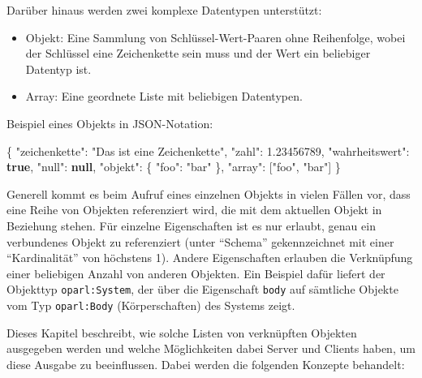 \documentclass[,a4paper]{article}
\newenvironment{Shaded}{}{}
\newcommand{\KeywordTok}[1]{\textcolor[rgb]{0.00,0.44,0.13}{\textbf{{#1}}}}
\newcommand{\DataTypeTok}[1]{\textcolor[rgb]{0.56,0.13,0.00}{{#1}}}
\newcommand{\FloatTok}[1]{\textcolor[rgb]{0.25,0.63,0.44}{{#1}}}
\newcommand{\StringTok}[1]{\textcolor[rgb]{0.25,0.44,0.63}{{#1}}}
\newcommand{\OtherTok}[1]{\textcolor[rgb]{0.00,0.44,0.13}{{#1}}}
\newcommand{\FunctionTok}[1]{\textcolor[rgb]{0.02,0.16,0.49}{{#1}}}
\begin{document}
Darüber hinaus werden zwei komplexe Datentypen unterstützt:

\begin{itemize}
\itemsep1pt\parskip0pt
\item
  Objekt: Eine Sammlung von Schlüssel-Wert-Paaren ohne Reihenfolge,
  wobei der Schlüssel eine Zeichenkette sein muss und der Wert ein
  beliebiger Datentyp ist.
\item
  Array: Eine geordnete Liste mit beliebigen Datentypen.
\end{itemize}

Beispiel eines Objekts in JSON-Notation:

\begin{Shaded}
\begin{Highlighting}[]
\FunctionTok{\{}
    \DataTypeTok{"zeichenkette"}\FunctionTok{:} \StringTok{"Das ist eine Zeichenkette"}\FunctionTok{,}
    \DataTypeTok{"zahl"}\FunctionTok{:} \FloatTok{1.23456789}\FunctionTok{,}
    \DataTypeTok{"wahrheitswert"}\FunctionTok{:} \KeywordTok{true}\FunctionTok{,}
    \DataTypeTok{"null"}\FunctionTok{:} \KeywordTok{null}\FunctionTok{,}
    \DataTypeTok{"objekt"}\FunctionTok{:} \FunctionTok{\{}
        \DataTypeTok{"foo"}\FunctionTok{:} \StringTok{"bar"}
    \FunctionTok{\},}
    \DataTypeTok{"array"}\FunctionTok{:} \OtherTok{[}\StringTok{"foo"}\OtherTok{,} \StringTok{"bar"}\OtherTok{]}
\FunctionTok{\}}
\end{Highlighting}
\end{Shaded}


Generell kommt es beim Aufruf eines einzelnen Objekts in vielen Fällen
vor, dass eine Reihe von Objekten referenziert wird, die mit dem
aktuellen Objekt in Beziehung stehen. Für einzelne Eigenschaften ist es
nur erlaubt, genau ein verbundenes Objekt zu referenziert (unter
``Schema'' gekennzeichnet mit einer ``Kardinalität'' von höchstens 1).
Andere Eigenschaften erlauben die Verknüpfung einer beliebigen Anzahl
von anderen Objekten. Ein Beispiel dafür liefert der Objekttyp
\texttt{oparl:System}, der über die Eigenschaft \texttt{body} auf
sämtliche Objekte vom Typ \texttt{oparl:Body} (Körperschaften) des
Systems zeigt.

Dieses Kapitel beschreibt, wie solche Listen von verknüpften Objekten
ausgegeben werden und welche Möglichkeiten dabei Server und Clients
haben, um diese Ausgabe zu beeinflussen. Dabei werden die folgenden
Konzepte behandelt:
\end{document}
